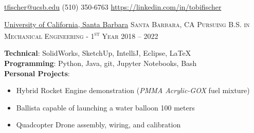 \documentclass[12pt]{article}
\begin{document}
\sloppy  %



\nobreakvspace{0.3em}  %



\noindent\href{mailto:tfischer@ucsb.edu}{tfischer@ucsb.edu}\sbull
(510) 350-6763 \sbull
\href{https://linkedin.com/in/tobifischer}{https://linkedin.com/in/tobifischer}\hfill
{}


\spacedhrule{0.2em}{-0.6em}  %


\headedsection
{\href{https://engineering.ucsb.edu/}{University of California, Santa Barbara}}
{\textsc{Santa Barbara, CA}} {%
	\headedsubsection
	{\textsc{Pursuing B.S. in Mechanical Engineering - {\large 1}\textsuperscript{st} Year}}
	{2018 -- 2022}{}
}

\spacedhrule{0em}{-0.5em}


	\textbf{Technical}: SolidWorks, SketchUp, IntelliJ, Eclipse, \LaTeX\\
	\textbf{Programming}: Python, Java, git, Jupyter Notebooks, Bash\\
	\textbf{Personal Projects}:
	\begin{itemize}
		\item {\large \vspace{-0.3em} Hybrid Rocket Engine demonstration (\textit{PMMA Acrylic-GOX} fuel mixture)}
		\item {\large \vspace{-0.35em} Ballista capable of launching a water balloon 100 meters}
		\item {\large \vspace{-0.35em} Quadcopter Drone assembly, wiring, and calibration}
	\end{itemize}
	
\end{document}
